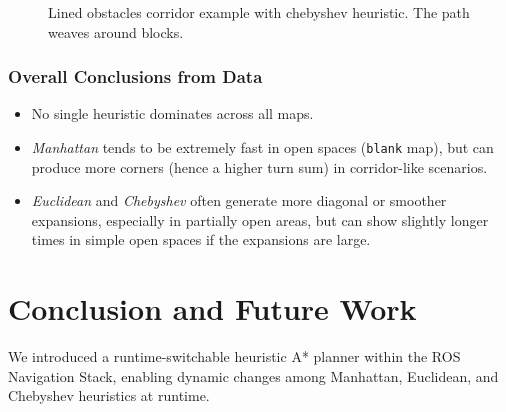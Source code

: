 \documentclass[letterpaper, 10 pt, conference]{ieeeconf}
\begin{document}
\begin{figure}[!ht]
    \centering
    \caption{Lined obstacles corridor example with chebyshev heuristic. The path weaves around blocks.}
    \label{fig:lined_corridor_paths}
\end{figure}

\subsubsection{Overall Conclusions from Data}
\begin{itemize}
    \item No single heuristic dominates across all maps.
    \item \emph{Manhattan} tends to be extremely fast in open spaces (\texttt{blank} map), but can produce more corners (hence a higher turn sum) in corridor-like scenarios.
    \item \emph{Euclidean} and \emph{Chebyshev} often generate more diagonal or smoother expansions, especially in partially open areas, but can show slightly longer times in simple open spaces if the expansions are large.
\end{itemize}


\section{Conclusion and Future Work}\label{sec:conclusion}
We introduced a runtime-switchable heuristic A* planner within the ROS Navigation Stack, enabling dynamic changes among Manhattan, Euclidean, and Chebyshev heuristics at runtime. 
\end{document}
